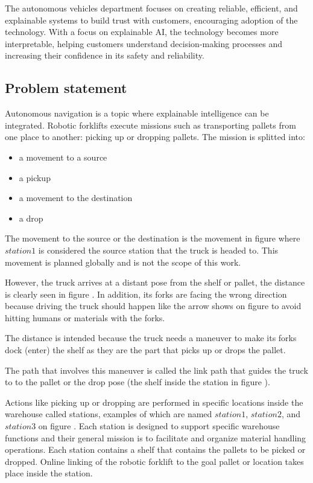 The autonomous vehicles department focuses on creating reliable, efficient, and 
explainable systems to build trust with customers, encouraging adoption of the technology. 
With a focus on explainable AI, the technology becomes more interpretable, helping customers 
understand decision-making processes and increasing their confidence in its safety and reliability.

\newpage
\subsection{Problem statement}

Autonomous navigation is a topic where explainable intelligence can be integrated. 
Robotic forklifts execute missions such as transporting pallets from one place to another: 
picking up or dropping pallets.
The mission is splitted into:
\begin{itemize}
    \item a movement to a source
    \item a pickup
    \item a movement to the destination
    \item a drop
\end{itemize}
The movement to the source or the destination is the movement in figure  where \(station1\) 
is considered the source station that the truck is headed to.
This movement is planned globally and is not the scope of this work. 

However, the truck arrives at a distant pose from the shelf or pallet,
the distance is clearly seen in figure . In addition, its forks are facing the 
wrong direction because driving the truck should happen like the arrow shows on figure  
to avoid hitting humans or materials with the forks.

The distance is intended because the truck needs a maneuver to make its forks dock (enter) the shelf
as they are the part that picks up or drops the pallet.


The path that involves this maneuver is called the link path that guides the truck to to the pallet or the drop 
pose (the shelf inside the station in figure ). 

Actions like picking up or dropping are performed in specific locations inside the warehouse called 
stations, examples of which are named \(station1\), \(station2\), and \(station3\) on figure .
Each station is designed to support specific warehouse functions and their general mission
is to facilitate and organize material handling operations. 
Each station contains a shelf that contains the pallets to be picked or dropped. 
Online linking of the robotic forklift to the goal pallet or location takes place inside
the station.

